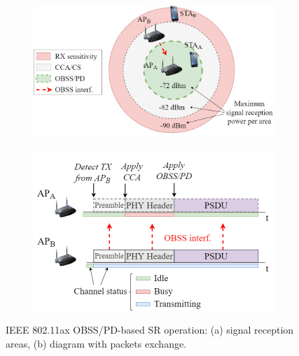 \documentclass[10pt,a4paper,twocolumn]{article}
\def\startfigure{\vspace{6pt}\begin{figure}[ht]\center}
\begin{document}
\startfigure
\begin{subfigure}[b]{\linewidth}
	\centering
	\includegraphics[width=.75\textwidth]{img/obsspd_1}
	\caption{}
	\label{fig:obsspd_1}
\end{subfigure}
\begin{subfigure}[b]{.75\linewidth}
	\centering
	\includegraphics[width=\textwidth]{img/obsspd_2}
	\caption{}
	\label{fig:obsspd_2}
\end{subfigure}
\caption{IEEE 802.11ax OBSS/PD-based SR operation: (a) signal reception areas, (b) diagram with packets exchange.}\label{fig:sr_operation} 
\end{figure}
\end{document}
